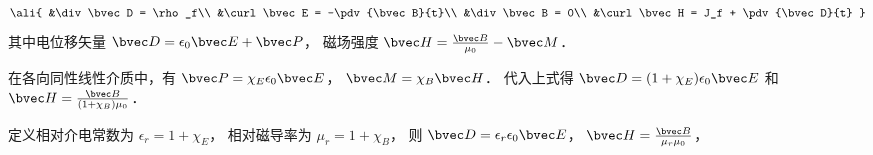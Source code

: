 
\begin{issues}
\issueDraft
\end{issues}


\begin{equation}\ali{
&\div\bvec D = \rho_f\\
&\curl\bvec E = -\pdv{\bvec B}{t}\\
&\div\bvec B = 0\\
&\curl\bvec H = J_f + \pdv{\bvec D}{t}
}\end{equation}
其中电位移矢量 $\bvec D = \epsilon_0 \bvec E + \bvec P$，  磁场强度 $\bvec H = \frac{\bvec B}{\mu_0} - \bvec M$．

在各向同性线性介质中，有 $\bvec P = \chi_E \epsilon_0 \bvec E$，  $\bvec M = \chi_B \bvec H$．  代入上式得 $\bvec D = (1 + \chi_E)\epsilon_0\bvec E$ 和  $\bvec H = \frac{\bvec B}{(1 + \chi_B)\mu_0}$． 

定义相对介电常数为 $\epsilon_r = 1 + \chi_E$， 相对磁导率为 $\mu_r = 1 + \chi_B$， 则 $\bvec D = \epsilon_r\epsilon_0\bvec E$， $\bvec H = \frac{\bvec B}{\mu_r\mu_0}$，  
